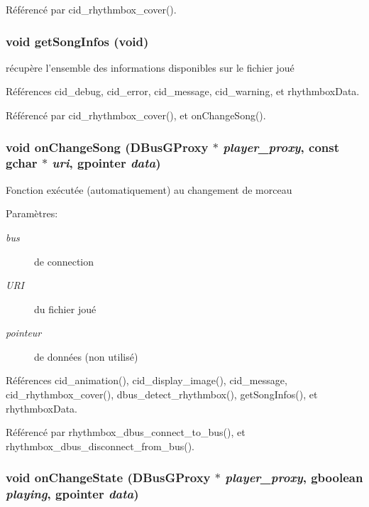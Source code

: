 Référencé par cid\_\-rhythmbox\_\-cover().
\subsubsection{\setlength{\rightskip}{0pt plus 5cm}void getSongInfos (void)}\label{cid-rhythmbox_8h_ce85b541409fc3d7ba26a2ab47617b16}


récupère l'ensemble des informations disponibles sur le fichier joué 

Références cid\_\-debug, cid\_\-error, cid\_\-message, cid\_\-warning, et rhythmboxData.

Référencé par cid\_\-rhythmbox\_\-cover(), et onChangeSong().
\subsubsection{\setlength{\rightskip}{0pt plus 5cm}void onChangeSong (DBusGProxy $\ast$ {\em player\_\-proxy}, \/  const gchar $\ast$ {\em uri}, \/  gpointer {\em data})}\label{cid-rhythmbox_8h_1d6e9f9b5bc40a54129f0e103ff4504a}


Fonction exécutée (automatiquement) au changement de morceau \begin{Desc}
\item[Paramètres:]
\begin{description}
\item[{\em bus}]de connection \item[{\em URI}]du fichier joué \item[{\em pointeur}]de données (non utilisé) \end{description}
\end{Desc}


Références cid\_\-animation(), cid\_\-display\_\-image(), cid\_\-message, cid\_\-rhythmbox\_\-cover(), dbus\_\-detect\_\-rhythmbox(), getSongInfos(), et rhythmboxData.

Référencé par rhythmbox\_\-dbus\_\-connect\_\-to\_\-bus(), et rhythmbox\_\-dbus\_\-disconnect\_\-from\_\-bus().
\subsubsection{\setlength{\rightskip}{0pt plus 5cm}void onChangeState (DBusGProxy $\ast$ {\em player\_\-proxy}, \/  gboolean {\em playing}, \/  gpointer {\em data})}\label{cid-rhythmbox_8h_ee04942451ff86a8e17a52b407ac11f1}


